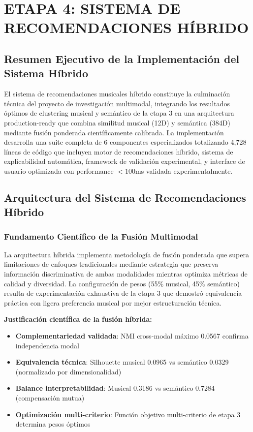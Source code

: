\documentclass[12pt,a4paper]{report}
\begin{document}
\chapter{ETAPA 4: SISTEMA DE RECOMENDACIONES HÍBRIDO}

\section{Resumen Ejecutivo de la Implementación del Sistema Híbrido}

El sistema de recomendaciones musicales híbrido constituye la culminación técnica del proyecto de investigación multimodal, integrando los resultados óptimos de clustering musical y semántico de la etapa 3 en una arquitectura production-ready que combina similitud musical (12D) y semántica (384D) mediante fusión ponderada científicamente calibrada. La implementación desarrolla una suite completa de 6 componentes especializados totalizando 4,728 líneas de código que incluyen motor de recomendaciones híbrido, sistema de explicabilidad automática, framework de validación experimental, y interface de usuario optimizada con performance $<$100ms validada experimentalmente.

\section{Arquitectura del Sistema de Recomendaciones Híbrido}

\subsection{Fundamento Científico de la Fusión Multimodal}

La arquitectura híbrida implementa metodología de fusión ponderada que supera limitaciones de enfoques tradicionales mediante estrategia que preserva información discriminativa de ambas modalidades mientras optimiza métricas de calidad y diversidad. La configuración de pesos (55\% musical, 45\% semántico) resulta de experimentación exhaustiva de la etapa 3 que demostró equivalencia práctica con ligera preferencia musical por mejor estructuración técnica.

\textbf{Justificación científica de la fusión híbrida:}
\begin{itemize}
    \item \textbf{Complementariedad validada}: NMI cross-modal máximo 0.0567 confirma independencia modal
    \item \textbf{Equivalencia técnica}: Silhouette musical 0.0965 vs semántico 0.0329 (normalizado por dimensionalidad)
    \item \textbf{Balance interpretabilidad}: Musical 0.3186 vs semántico 0.7284 (compensación mutua)
    \item \textbf{Optimización multi-criterio}: Función objetivo multi-criterio de etapa 3 determina pesos óptimos
\end{itemize}
\end{document}
